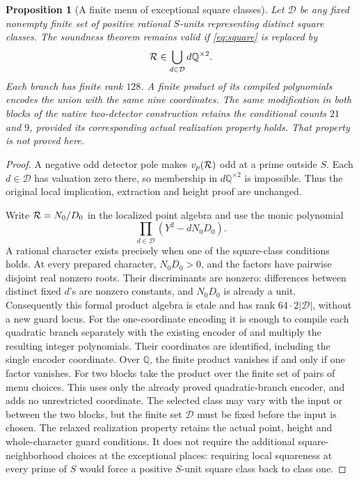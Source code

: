 \documentclass[11pt,a4paper]{article}
\newtheorem{proposition}[theorem]{Proposition}
\newcommand{\Q}{\mathbb Q}\newcommand{\Z}{\mathbb Z}
\begin{document}
\begin{proposition}[A finite menu of exceptional square classes]\label{prop:menu}
Let \(\mathcal D\) be any fixed nonempty finite set of positive rational
\(S\)-units representing distinct square classes. The soundness theorem
remains valid if \eqref{eq:square} is replaced by
\[
       {\cal R}\in\bigcup_{d\in\mathcal D}d\Q^{\times2}.
\]
Each branch has finite rank \(128\). A finite product of its compiled
polynomials encodes the union with the same nine coordinates.
The same modification in both blocks of
the native two-detector construction retains the conditional counts
\(21\) and \(9\), provided its corresponding actual realization
property holds. That property is not proved here.
\end{proposition}
\begin{proof}
A negative odd detector pole makes \(v_p({\cal R})\) odd at a prime
outside \(S\). Each \(d\in\mathcal D\) has valuation zero there,
so membership in \(d\Q^{\times2}\) is impossible. Thus the original
local implication, extraction and height proof are unchanged.

Write \({\cal R}=N_0/D_0\) in the localized point algebra and use
the monic polynomial
\[
              \prod_{d\in\mathcal D}(Y^2-dN_0D_0).
\]
A rational character exists precisely when one of the square-class
conditions holds. At every prepared character, \(N_0D_0>0\), and
the factors have pairwise disjoint real nonzero roots. Their
discriminants are nonzero: differences between distinct fixed \(d\)'s
are nonzero constants, and \(N_0D_0\) is already a unit.
Consequently this formal product algebra is etale and has rank
\(64\cdot2|\mathcal D|\), without a new guard locus.
For the one-coordinate encoding it is enough to compile each
quadratic branch separately with the existing encoder of \cite{Unit}
and multiply the resulting integer polynomials. Their coordinates
are identified, including the single encoder coordinate. Over \(\Q\),
the finite product vanishes if and only if one factor vanishes.
For two blocks take the product over the finite set of pairs of
menu choices. This uses only the already proved quadratic-branch
encoder, and adds no unrestricted coordinate.
The selected class may
vary with the input or between the two blocks, but the finite set
\(\mathcal D\) must be fixed before the input is chosen.
The relaxed realization property retains the actual point, height
and whole-character guard conditions. It does not require the
additional square-neighborhood choices at the exceptional places:
requiring local squareness at every prime of \(S\) would force a
positive \(S\)-unit square class back to class one.
\end{proof}
\end{document}
